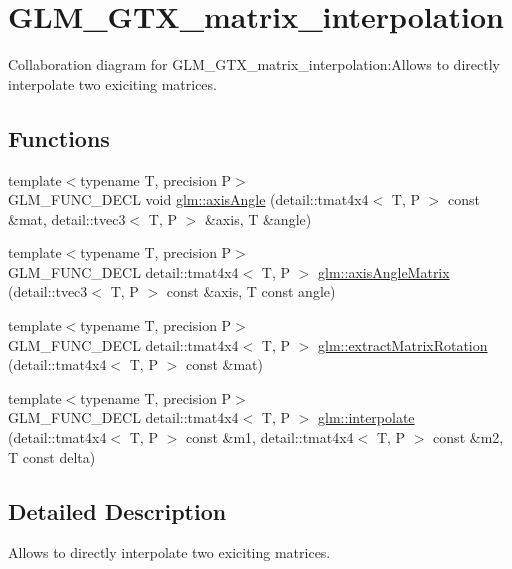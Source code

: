 \hypertarget{group__gtx__matrix__interpolation}{
\section{GLM\_\-GTX\_\-matrix\_\-interpolation}
\label{group__gtx__matrix__interpolation}
}


Collaboration diagram for GLM\_\-GTX\_\-matrix\_\-interpolation:Allows to directly interpolate two exiciting matrices.  
\subsection*{Functions}
\begin{CompactItemize}
\item 
{\footnotesize template$<$typename T, precision P$>$ }\\GLM\_\-FUNC\_\-DECL void \hyperlink{group__gtx__matrix__interpolation_g16474d44af6a32a07c50df2409526d95}{glm::axisAngle} (detail::tmat4x4$<$ T, P $>$ const \&mat, detail::tvec3$<$ T, P $>$ \&axis, T \&angle)
\item 
{\footnotesize template$<$typename T, precision P$>$ }\\GLM\_\-FUNC\_\-DECL detail::tmat4x4$<$ T, P $>$ \hyperlink{group__gtx__matrix__interpolation_gf7c0106d03d55a7b670a6261b107f22b}{glm::axisAngleMatrix} (detail::tvec3$<$ T, P $>$ const \&axis, T const angle)
\item 
{\footnotesize template$<$typename T, precision P$>$ }\\GLM\_\-FUNC\_\-DECL detail::tmat4x4$<$ T, P $>$ \hyperlink{group__gtx__matrix__interpolation_gf559937fe5cea133f5e7f3c228255960}{glm::extractMatrixRotation} (detail::tmat4x4$<$ T, P $>$ const \&mat)
\item 
{\footnotesize template$<$typename T, precision P$>$ }\\GLM\_\-FUNC\_\-DECL detail::tmat4x4$<$ T, P $>$ \hyperlink{group__gtx__matrix__interpolation_gc618bbef632f87be5c570aa5afe63f30}{glm::interpolate} (detail::tmat4x4$<$ T, P $>$ const \&m1, detail::tmat4x4$<$ T, P $>$ const \&m2, T const delta)
\end{CompactItemize}


\subsection{Detailed Description}
Allows to directly interpolate two exiciting matrices. 

